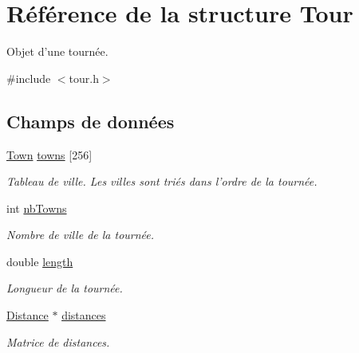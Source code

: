 \hypertarget{structTour}{
\section{Référence de la structure Tour}
\label{structTour}
}


Objet d'une tournée.  




{\ttfamily \#include $<$tour.h$>$}

\subsection*{Champs de données}
\begin{DoxyCompactItemize}
\item 
\hypertarget{structTour_a3bbc2397fe043fdc5d9d18695368f2ca}{
\hyperlink{structTown}{Town} \hyperlink{structTour_a3bbc2397fe043fdc5d9d18695368f2ca}{towns} \mbox{[}256\mbox{]}}
\label{structTour_a3bbc2397fe043fdc5d9d18695368f2ca}

\begin{DoxyCompactList}\small\item\em Tableau de ville. Les villes sont triés dans l'ordre de la tournée. \item\end{DoxyCompactList}\item 
\hypertarget{structTour_af54d0892d0de565850fdf26e98b90a03}{
int \hyperlink{structTour_af54d0892d0de565850fdf26e98b90a03}{nbTowns}}
\label{structTour_af54d0892d0de565850fdf26e98b90a03}

\begin{DoxyCompactList}\small\item\em Nombre de ville de la tournée. \item\end{DoxyCompactList}\item 
\hypertarget{structTour_ad7ec8574d813b76140f78b035cdd93a9}{
double \hyperlink{structTour_ad7ec8574d813b76140f78b035cdd93a9}{length}}
\label{structTour_ad7ec8574d813b76140f78b035cdd93a9}

\begin{DoxyCompactList}\small\item\em Longueur de la tournée. \item\end{DoxyCompactList}\item 
\hypertarget{structTour_a4da8a499459d000a23d79af9d1a5565d}{
\hyperlink{structDistance}{Distance} $\ast$ \hyperlink{structTour_a4da8a499459d000a23d79af9d1a5565d}{distances}}
\label{structTour_a4da8a499459d000a23d79af9d1a5565d}

\begin{DoxyCompactList}\small\item\em Matrice de distances. \item\end{DoxyCompactList}\end{DoxyCompactItemize}


